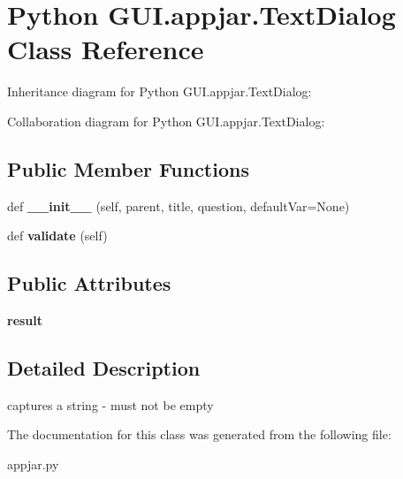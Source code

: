 \hypertarget{class_python_01_g_u_i_1_1appjar_1_1_text_dialog}{}\section{Python G\+U\+I.\+appjar.\+Text\+Dialog Class Reference}
\label{class_python_01_g_u_i_1_1appjar_1_1_text_dialog}


Inheritance diagram for Python G\+U\+I.\+appjar.\+Text\+Dialog\+:


Collaboration diagram for Python G\+U\+I.\+appjar.\+Text\+Dialog\+:
\subsection*{Public Member Functions}
\begin{DoxyCompactItemize}
\item 
\mbox{\label{class_python_01_g_u_i_1_1appjar_1_1_text_dialog_a21bdaf925cbdfd1670fb88e52425b650}} 
def {\bfseries \+\_\+\+\_\+init\+\_\+\+\_\+} (self, parent, title, question, default\+Var=None)
\item 
\mbox{\label{class_python_01_g_u_i_1_1appjar_1_1_text_dialog_a082c9e93034a853efff1d47f329f5039}} 
def {\bfseries validate} (self)
\end{DoxyCompactItemize}
\subsection*{Public Attributes}
\begin{DoxyCompactItemize}
\item 
\mbox{\label{class_python_01_g_u_i_1_1appjar_1_1_text_dialog_aff3ec2a42c52f15bd95ba131f137ae29}} 
{\bfseries result}
\end{DoxyCompactItemize}


\subsection{Detailed Description}
\begin{DoxyVerb}captures a string - must not be empty \end{DoxyVerb}
 

The documentation for this class was generated from the following file\+:\begin{DoxyCompactItemize}
\item 
appjar.\+py\end{DoxyCompactItemize}
